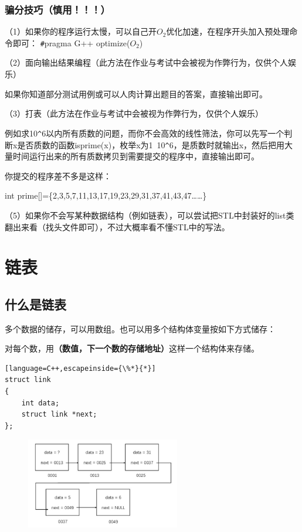 \documentclass[UTF8]{ctexart}
\begin{document}
\subsubsection{骗分技巧（慎用！！！）}
（1）如果你的程序运行太慢，可以自己开$O_2$优化加速，在程序开头加入预处理命令即可：
\verb|#|pragma G++ optimize($O_2$)

（2）面向输出结果编程（此方法在作业与考试中会被视为作弊行为，仅供个人娱乐）

如果你知道部分测试用例或可以人肉计算出题目的答案，直接输出即可。

（3）打表（此方法在作业与考试中会被视为作弊行为，仅供个人娱乐）

例如求10\verb|^|6以内所有质数的问题，而你不会高效的线性筛法，你可以先写一个判断x是否质数的函数isprime(x)，枚举x为1~10\verb|^|6，是质数时就输出x，然后把用大量时间运行出来的所有质数拷贝到需要提交的程序中，直接输出即可。

你提交的程序差不多是这样：

int prime[]=\{2,3,5,7,11,13,17,19,23,29,31,37,41,43,47……\}


（5）如果你不会写某种数据结构（例如链表），可以尝试把STL中封装好的list类翻出来看（找头文件即可），不过大概率看不懂STL中的写法。

\section{链表}
\subsection{什么是链表}
多个数据的储存，可以用数组。也可以用多个结构体变量按如下方式储存：

对每个数，用\textbf{（数值，下一个数的存储地址）}这样一个结构体来存储。
\begin{lstlisting}[language=C++,escapeinside={\%*}{*}]
struct link
{
	int data;
	struct link *next;
};
\end{lstlisting}

\begin{figure}[H]
\centering
\includegraphics[width=0.6\textwidth,keepaspectratio]{picture/4.1.jpg}
\end{figure}
\end{document}
